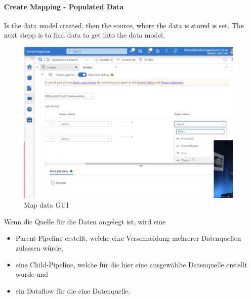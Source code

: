 \paragraph{Create Mapping - Populated Data}
Is the data model created, then the source, where the data is stored is set. The next stepp is to find data to get into the data model.

\begin{figure}[H]
	\centering
	\includegraphics[scale = 0.2]{attachment/chapter_2/Scc145}
	\caption{Map data GUI}
\end{figure}

Wenn die Quelle für die Daten angelegt ist, wird eine 
\begin{itemize}
	\item Parent-Pipeline erstellt, welche eine Verschneidung mehrerer Datenquellen zulassen würde, 
	\item eine Child-Pipeline, welche für die hier eine ausgewählte Datenquelle erstellt wurde und
	\item ein Dataflow für die eine Datenquelle.
\end{itemize}

